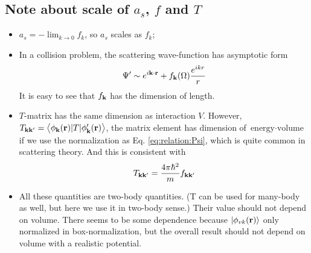 \subsection{Note about scale of $a_{s}$, $f$ and $T$}
\begin{itemize}
\item $a_{s}=-\lim_{k\rightarrow0}f_{k}$, so $a_{s}$ scales as $f_{k}$;
\item In a collision problem, the scattering wave-function has asymptotic form
\begin{equation}\label{eq:relation:Psi}
\Psi^{\prime}\sim{}e^{{i\mathbf{k}\cdot\mathbf{r}}}+f_{\mathbf{k}}(\Omega)\frac{e^{ikr}}{r}
\end{equation}
It is easy to see that $f_{\mathbf{k}}$ has the dimension of length.
\item $T$-matrix has the same dimension as interaction $V$.  However, $T_{{\mathbf{k}\mathbf{k}'}}=\bigl<{\phi_{\mathbf{k}}(\mathbf{r}){\lvert{T}\rvert}\phi_{\mathbf{k}}'(\mathbf{r})}\bigr>$, the matrix element has dimension of $\text{energy}\cdot\text{volume}$ if we use the normalization as Eq. \eqref{eq:relation:Psi}, which is quite common in scattering theory. And this is consistent with 
\begin{equation}
T_{\mathbf{k}\mathbf{k}'}=\frac{4\pi\hbar^{2}}{m}f_{\mathbf{k}\mathbf{k}'}
\end{equation}
 \item  All these quantities are two-body quantities.  (T can be used for many-body as well, but here we use it in two-body sense.) Their value should not depend on volume.  There seems to be some dependence because $\left|\phi_{vk}(\mathbf{r})\right>$ only normalized in box-normalization, but the overall result should not depend on volume with a realistic potential.  
\end{itemize}
